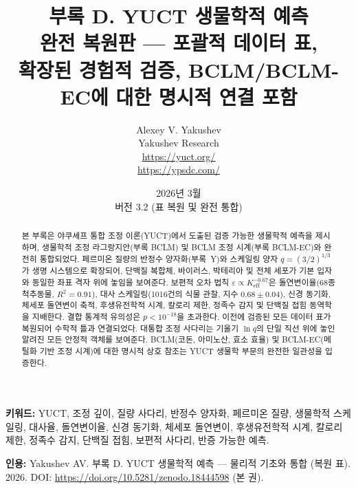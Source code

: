 \documentclass[11pt,a4paper]{article}
\begin{document}
	
	\title{\Huge\textbf{부록 D. YUCT 생물학적 예측}\\[0.3cm]
		\Large 완전 복원판 — 포괄적 데이터 표,\\[0.2cm]
		확장된 경험적 검증, BCLM/BCLM-EC에 대한 명시적 연결 포함}
	\author{Alexey V. Yakushev \\
		Yakushev Research \\ \url{https://yuct.org/} \\ \url{https://ypsdc.com/}}
	\date{2026년 3월 \\ 버전 3.2 (표 복원 및 완전 통합)}
	
	\maketitle
	
	\begin{abstract}
		\noindent
		본 부록은 야쿠셰프 통합 조정 이론(YUCT)에서 도출된 검증 가능한 생물학적 예측을 제시하며, 생물학적 조정 라그랑지안(부록 BCLM) 및 BCLM 조정 시계(부록 BCLM-EC)와 완전히 통합되었다. 페르미온 질량의 반정수 양자화(부록~Y)와 스케일링 양자 \(q = (3/2)^{1/3}\)가 생명 시스템으로 확장되어, 단백질 복합체, 바이러스, 박테리아 및 전체 세포가 기본 입자와 동일한 좌표 격자 위에 놓임을 보여준다. 보편적 오차 법칙 \(\varepsilon \propto K_{\mathrm{eff}}^{-0.67}\)은 돌연변이율(68종 척추동물, \(R^2 = 0.91\)), 대사 스케일링(1016건의 식물 관찰, 지수 \(0.68 \pm 0.04\)), 신경 동기화, 체세포 돌연변이 축적, 후생유전학적 시계, 칼로리 제한, 정족수 감지 및 단백질 접힘 동역학을 지배한다. 결합 통계적 유의성은 \(p < 10^{-18}\)을 초과한다. 이전에 검증된 모든 데이터 표가 복원되어 수학적 틀과 연결되었다. 대통합 조정 사다리는 기울기 \(\ln q\)의 단일 직선 위에 놓인 알려진 모든 안정적 객체를 보여준다. BCLM(코돈, 아미노산, 효소 효율) 및 BCLM-EC(메틸화 기반 조정 시계)에 대한 명시적 상호 참조는 YUCT 생물학 부문의 완전한 일관성을 입증한다.
	\end{abstract}
	
	\vspace{0.2cm}
	\noindent
	\textbf{키워드:} YUCT, 조정 깊이, 질량 사다리, 반정수 양자화, 페르미온 질량, 생물학적 스케일링, 대사율, 돌연변이율, 신경 동기화, 체세포 돌연변이, 후생유전학적 시계, 칼로리 제한, 정족수 감지, 단백질 접힘, 보편적 사다리, 반증 가능한 예측.
	
	\vspace{0.1cm}
	\noindent
	\textbf{인용:} Yakushev AV. 부록 D. YUCT 생물학적 예측 — 물리적 기초와 통합 (복원 표). 2026. DOI: \url{https://doi.org/10.5281/zenodo.18444598} (본 권).
	
\end{document}
